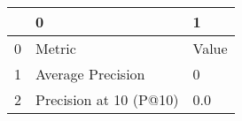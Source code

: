 \begin{tabular}{lll}
\toprule
{} &                       0 &      1 \\
\midrule
0 &                  Metric &  Value \\
1 &       Average Precision &      0 \\
2 &  Precision at 10 (P@10) &    0.0 \\
\bottomrule
\end{tabular}
